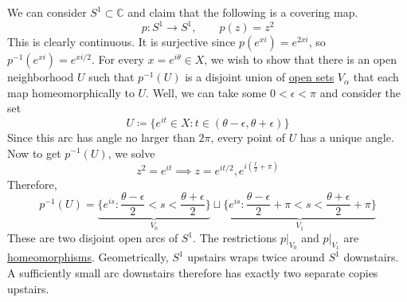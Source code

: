   \begin{example}
    \label{ex:covering-map-of-s1-to-itself}
    We can consider $S^1 \subset \mathbb{C}$ and claim that the following is a covering map. 
    \begin{equation}
      p: S^1 \to S^1, \qquad p(z) = z^2
    \end{equation}
		This is clearly continuous. It is surjective since $p(e^{xi}) = e^{2xi}$, so $p^{-1}(e^{xi}) = e^{xi/2}$. For every $x = e^{i \theta} \in X$, we wish to show that there is an open neighborhood $U$ such that $p^{-1} (U)$ is a disjoint union of \hyperref[pst-def:open-set]{open sets} $V_\alpha$ that each map homeomorphically to $U$. Well, we can take some $0 < \epsilon < \pi$ and consider the set 
		\begin{equation}
			U \coloneqq \{ e^{i t} \in X \colon t \in (\theta - \epsilon, \theta + \epsilon) \}
		\end{equation}
		Since this arc has angle no larger than $2\pi$, every point of $U$ has a unique angle. Now to get $p^{-1} (U)$, we solve 
		\begin{equation}
			z^2 = e^{it} \implies z = e^{it/2}, e^{i(\frac{t}{2} + \pi)}
		\end{equation}
		Therefore, 
		\begin{equation}
			p^{-1}(U) = \underbrace{\bigg\{ e^{is} \colon \frac{\theta - \epsilon}{2} < s < \frac{\theta + \epsilon}{2} \bigg\}}_{V_0} \sqcup \underbrace{\bigg\{ e^{is} \colon \frac{\theta - \epsilon}{2} + \pi < s < \frac{\theta + \epsilon}{2} + \pi \bigg\}}_{V_1}
		\end{equation}
		These are two disjoint open arcs of $S^1$. The restrictions $p|_{V_0}$ and $p|_{V_1}$ are \hyperref[pst-def:homeomorphism]{homeomorphisms}. Geometrically, $S^1$ upstairs wraps twice around $S^1$ downstairs. A sufficiently small arc downstairs therefore has exactly two separate copies upstairs. 
  \end{example}

